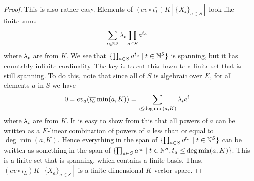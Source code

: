 \documentclass[../book.tex]{subfiles}
\begin{document}
\begin{proof}
    This is also rather easy. 
    Elements of $(ev \circ \bar{\iota_L}) K[\{X_a\}_{a\in S}]$ look like finite sums
    \[
        \sum_{t \in \mathbb{N}^{S}} 
        \lambda_t \prod_{a \in S} a^{t_a}
    \]
    where $\lambda_t$ are from $K$. 
    We see that $\{ \prod_{a \in S} a^{t_a} \mid t \in \mathbb{N}^{S}\}$ is spanning, 
    but it has countably infinite cardinality. 
    The key is to cut this down to a finite set that is still spanning. 
    To do this, note that since all of $S$ is algebraic over $K$, 
    for all elements $a$ in $S$ we have \[
        0 = ev_a(\overline{\iota_L} \min(a,K)) = \sum_{i\leq\deg\min(a,K)} \lambda_i a^i
    \]
    where $\lambda_i$ are from $K$. 
    It is easy to show from this that all powers of $a$ 
    can be written as a $K$-linear combination of powers of $a$ 
    less than or equal to $\deg\min(a,K)$. 
    Hence everything in the span of 
    $\{ \prod_{a \in S} a^{t_a} \mid t \in \mathbb{N}^{S}\}$
    can be written as something in the span of 
    $\{ \prod_{a \in S} a^{t_a} \mid t \in \mathbb{N}^S, t_a \leq \deg\min(a,K) \}$. 
    This is a finite set that is spanning,
    which contains a finite basis. 
    Thus, $(ev \circ \bar{\iota_L}) K[\{X_a\}_{a\in S}]$ is
    a finite dimensional $K$-vector space.  

\end{proof} 
\end{document}
